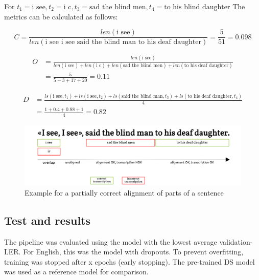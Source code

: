 For $t_1=\text{i see}, t_2=\text{i c}, t_3 = \text{sad the blind men}, t_4 = \text{to his blind daughter}$ The metrics can be calculated as follows:

\begin{equation}
C = \frac{len(\text{i see})}{len(\text{i see i see said the blind man to his deaf daughter})} = \frac{5}{51} = 0.098
\end{equation}

\begin{equation}
\begin{split}
O & = \frac{len(\text{i see})}{len(\text{i see}) + len(\text{i c}) + len(\text{sad the blind men}) + len(\text{to his deaf daughter})} \\
 & = \frac{5}{5 + 3 + 17 + 20} = 0.11
\end{split}
\end{equation}

\begin{equation}
\begin{split}
D & = \frac{ls(\text{i see}, t_1) + ls(\text{i see}, t_2) + ls(\text{said the blind man}, t_3) + ls(\text{to his deaf daughter}, t_4)}{4} \\
 & = \frac{1 + 0.4 + 0.88 + 1}{4} = 0.82
\end{split}
\end{equation}

\begin{figure}
	\includegraphics[width=\linewidth]{./img/example_alignment.png}
	\caption{Example for a partially correct alignment of parts of a sentence}
	\label{example_alignment}
\end{figure}

\subsection{Test and results}

The pipeline was evaluated using the model with the lowest average validation-\ac{LER}. For English, this was the model with dropouts. To prevent overfitting, training was stopped after x epochs (early stopping). The pre-trained \ac{DS} model was used as a reference model for comparison.

